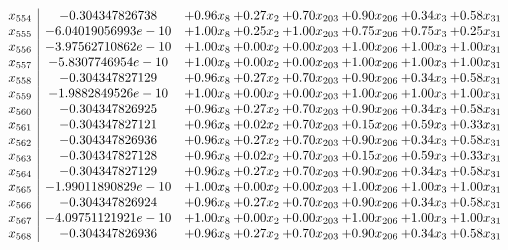 \documentclass[8pt]{article}
\begin{document}
\[\begin{array}{c| c c@{\hskip 2pt} c@{\hskip 2pt} c@{\hskip 2pt} c@{\hskip 2pt} c@{\hskip 2pt} c@{\hskip 2pt} }
 x_{554}   &  -0.304347826738 & +  0.96 x_{8} & +  0.27 x_{2} & +  0.70 x_{203} & +  0.90 x_{206} & +  0.34 x_{3} & +  0.58 x_{31}\\
 x_{555}   &  -6.04019056993e-10 & +  1.00 x_{8} & +  0.25 x_{2} & +  1.00 x_{203} & +  0.75 x_{206} & +  0.75 x_{3} & +  0.25 x_{31}\\
 x_{556}   &  -3.97562710862e-10 & +  1.00 x_{8} & +  0.00 x_{2} & +  0.00 x_{203} & +  1.00 x_{206} & +  1.00 x_{3} & +  1.00 x_{31}\\
 x_{557}   &  -5.8307746954e-10 & +  1.00 x_{8} & +  0.00 x_{2} & +  0.00 x_{203} & +  1.00 x_{206} & +  1.00 x_{3} & +  1.00 x_{31}\\
 x_{558}   &  -0.304347827129 & +  0.96 x_{8} & +  0.27 x_{2} & +  0.70 x_{203} & +  0.90 x_{206} & +  0.34 x_{3} & +  0.58 x_{31}\\
 x_{559}   &  -1.9882849526e-10 & +  1.00 x_{8} & +  0.00 x_{2} & +  0.00 x_{203} & +  1.00 x_{206} & +  1.00 x_{3} & +  1.00 x_{31}\\
 x_{560}   &  -0.304347826925 & +  0.96 x_{8} & +  0.27 x_{2} & +  0.70 x_{203} & +  0.90 x_{206} & +  0.34 x_{3} & +  0.58 x_{31}\\
 x_{561}   &  -0.304347827121 & +  0.96 x_{8} & +  0.02 x_{2} & +  0.70 x_{203} & +  0.15 x_{206} & +  0.59 x_{3} & +  0.33 x_{31}\\
 x_{562}   &  -0.304347826936 & +  0.96 x_{8} & +  0.27 x_{2} & +  0.70 x_{203} & +  0.90 x_{206} & +  0.34 x_{3} & +  0.58 x_{31}\\
 x_{563}   &  -0.304347827128 & +  0.96 x_{8} & +  0.02 x_{2} & +  0.70 x_{203} & +  0.15 x_{206} & +  0.59 x_{3} & +  0.33 x_{31}\\
 x_{564}   &  -0.304347827129 & +  0.96 x_{8} & +  0.27 x_{2} & +  0.70 x_{203} & +  0.90 x_{206} & +  0.34 x_{3} & +  0.58 x_{31}\\
 x_{565}   &  -1.99011890829e-10 & +  1.00 x_{8} & +  0.00 x_{2} & +  0.00 x_{203} & +  1.00 x_{206} & +  1.00 x_{3} & +  1.00 x_{31}\\
 x_{566}   &  -0.304347826924 & +  0.96 x_{8} & +  0.27 x_{2} & +  0.70 x_{203} & +  0.90 x_{206} & +  0.34 x_{3} & +  0.58 x_{31}\\
 x_{567}   &  -4.09751121921e-10 & +  1.00 x_{8} & +  0.00 x_{2} & +  0.00 x_{203} & +  1.00 x_{206} & +  1.00 x_{3} & +  1.00 x_{31}\\
 x_{568}   &  -0.304347826936 & +  0.96 x_{8} & +  0.27 x_{2} & +  0.70 x_{203} & +  0.90 x_{206} & +  0.34 x_{3} & +  0.58 x_{31}\\

\end{array}\]
\end{document}
